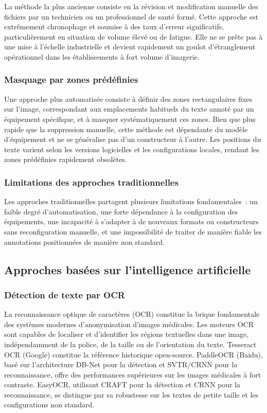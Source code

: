 La méthode la plus ancienne consiste en la révision et modification manuelle des fichiers par un technicien ou un professionnel de santé formé. Cette approche est extrêmement chronophage et soumise à des taux d'erreur significatifs, particulièrement en situation de volume élevé ou de fatigue. Elle ne se prête pas à une mise à l'échelle industrielle et devient rapidement un goulot d'étranglement opérationnel dans les établissements à fort volume d'imagerie.

\subsubsection{Masquage par zones prédéfinies}

Une approche plus automatisée consiste à définir des zones rectangulaires fixes sur l'image, correspondant aux emplacements habituels du texte annoté par un équipement spécifique, et à masquer systématiquement ces zones. Bien que plus rapide que la suppression manuelle, cette méthode est dépendante du modèle d'équipement et ne se généralise pas d'un constructeur à l'autre. Les positions du texte varient selon les versions logicielles et les configurations locales, rendant les zones prédéfinies rapidement obsolètes.

\subsubsection{Limitations des approches traditionnelles}

Les approches traditionnelles partagent plusieurs limitations fondamentales~: un faible degré d'automatisation, une forte dépendance à la configuration des équipements, une incapacité à s'adapter à de nouveaux formats ou constructeurs sans reconfiguration manuelle, et une impossibilité de traiter de manière fiable les annotations positionnées de manière non standard.

\subsection{Approches basées sur l'intelligence artificielle}

\subsubsection{Détection de texte par OCR}

La reconnaissance optique de caractères (OCR) constitue la brique fondamentale des systèmes modernes d'anonymisation d'images médicales. Les moteurs OCR sont capables de localiser et d'identifier les régions textuelles dans une image, indépendamment de la police, de la taille ou de l'orientation du texte. Tesseract OCR (Google) constitue la référence historique open-source. PaddleOCR (Baidu), basé sur l'architecture DB-Net pour la détection et SVTR/CRNN pour la reconnaissance, offre des performances supérieures sur les images médicales à fort contraste. EasyOCR, utilisant CRAFT pour la détection et CRNN pour la reconnaissance, se distingue par sa robustesse sur les textes de petite taille et les configurations non standard.

